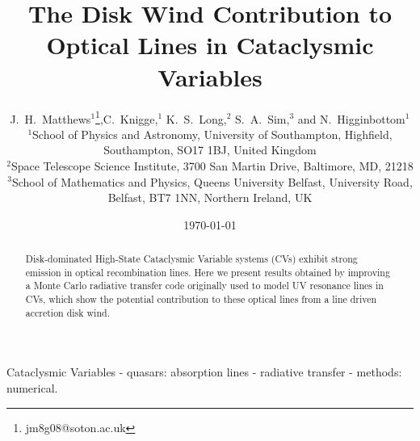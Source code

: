 \documentclass[usenatbib, a4paper]{mn2e}
\begin{document}

\renewcommand{\labelitemi}{$-$}
\def\la{Ly-$\alpha$ }
\def\py{\textsc{Python} }
\def\civ{C~\textsc{iv} }
\def\araa{ARAA}
\def\nat{Nature}
\def\apjl{ApJ Letters}
\def\aapr{AAPR}
\def\ssr{SSR}
\def\apj{ApJ}
\def\pasp{PASP}
\def\aap{A\&A}
\def\mnras{MNRAS}
\def\aj{AJ}
\def\rmxaa{RMXAA}

%
%

\title[Optical Lines from CV Disk Winds]
{The Disk Wind Contribution to Optical Lines in Cataclysmic Variables}

\author[Matthews et al.]{J.~H.~Matthews$^1$\thanks{jm8g08@soton.ac.uk},C.~Knigge,$^1$ K.~S.~Long,$^2$ S.~A.~Sim,$^3$ and N.~Higginbottom$^1$
\medskip  
\\$^1$School of Physics and Astronomy, University of Southampton, Highfield, Southampton, SO17 1BJ, United Kingdom
\\$^2$Space Telescope Science Institute, 3700 San Martin Drive, Baltimore, MD, 21218
\\$^3$School of Mathematics and Physics, Queens University Belfast, University Road, Belfast, BT7 1NN, Northern Ireland, UK}

\date{\today}


%
%
\maketitle





\begin{abstract}
Disk-dominated High-State Cataclysmic Variable systems (CVs) exhibit strong emission in optical recombination lines.
Here we present results obtained by improving a Monte Carlo radiative transfer code originally used
to model UV resonance lines in CVs, which show the potential contribution to these optical lines
from a line driven accretion disk wind.
\end{abstract}


\begin{keywords}
Cataclysmic Variables - quasars: absorption lines - radiative transfer - 
methods: numerical.
\end{keywords}
\end{document}

